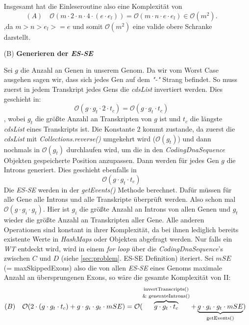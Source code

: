 \documentclass[12pt]{article}
\begin{document}
\begin{enumerate}
		Insgesamt hat die Einleseroutine also eine Komplexität von
		\[
			(A) \hspace{1em} \mathcal{O}(m \cdot 2 \cdot n \cdot 4 \cdot  (e \cdot e_{l})) = \mathcal{O}(m \cdot n \cdot e \cdot e_{l}) \in  \mathcal{O}(m^{2})
			.\]
		,da $m > n > e_{l} >= e$ und somit $\mathcal{O}(m^{2})$ eine valide obere Schranke darstellt.
	\item[(B)] \textbf{Generieren der \textit{ES-SE}}

		Sei $g$ die Anzahl an Genen in unserem Genom. Da wir vom Worst Case ausgehen sagen wir,
		dass sich jedes Gen auf dem \textit{"-"} Strang befindet.
		So muss zuerst in jedem Transkript jedes Gens die \textit{cdsList} invertiert werden.
		Dies geschieht in:
		\begin{equation}
			\mathcal{O}(g \cdot g_{t} \cdot 2 \cdot t_{c}) = \mathcal{O}(g \cdot g_{t} \cdot t_{c})
		\end{equation}
		, wobei $g_{t}$ die grö\ss te Anzahl an Transkripten von $g$ ist und $t_{c}$ die längste \textit{cdsList} eines Transkripts ist.
		Die Konstante $2$ kommt zustande, da zuerst die \textit{cdsList} mit \textit{Collections.reverse()} umgekehrt wird ($\mathcal{O}(g_{t})$) und
		dann nochmals in $\mathcal{O}(g_{t})$ durchlaufen wird, um die in den \textit{CodingDnaSequence} Objekten gespeicherte Position
		anzupassen.
		Dann werden für jedes Gen $g$ die Introns generiert. Dies geschieht ebenfalls in
		\begin{equation}
			\mathcal{O}(g \cdot g_{t} \cdot t_{c})
		\end{equation}
		Die \textit{ES-SE} werden in der \textit{getEvents()} Methode berechnet.
		Dafür müssen für alle Gene alle Introns und alle Transkripte überprüft werden.
		Also schon mal $\mathcal{O}(g \cdot g_{i} \cdot g_{t})$.
		Hier ist $g_{i}$ die grö\ss te Anzahl an Introns von allen Genen und $g_{t}$ wieder
		die grö\ss te Anzahl an Transkripten aller Gene. Alle anderen Operationen sind
		konstant in ihrer Komplexität, da bei ihnen lediglich bereits existente Werte
		in \textit{HashMaps} oder Objekten abgefragt werden.
		Nur falls ein \textit{WT} entdeckt wird, wird in einem \textit{for loop} über die
		\textit{CodingDnaSequence}'s zwischen $C$ und $D$ (siehe \ref{sec:problem}. ES-SE Definition) iteriert.
		Sei $mSE$ (= maxSkippedExons) also die von allen \textit{ES-SE} eines Genoms
		maximale Anzahl an übersprungenen Exons, so wäre die gesamte Komplexität von
		II:
		\begin{equation}
			(B) \hspace{1em} \mathcal{O}(2 \cdot (g \cdot g_{t} \cdot t_{c}) + g \cdot g_{i} \cdot g_{t} \cdot mSE) = \mathcal{O}(\overbrace{g \cdot g_{t} \cdot t_{c}}^{\shortstack{\scriptsize\text{invertTranscripts()} \\ \text{\scriptsize\& generateIntrons()}}} + \underbrace{g \cdot g_{i} \cdot g_{t} \cdot mSE}_{\text{getEvents()}} )
		\end{equation}


\end{enumerate}
\end{document}
